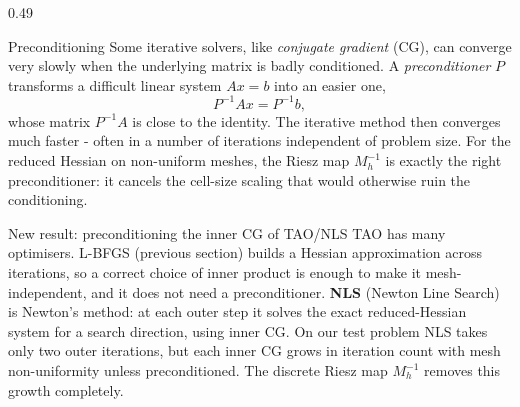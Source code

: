 \documentclass[final]{beamer}
\begin{document}
\begin{frame}[t]
\begin{columns}[t,totalwidth=\dimexpr\paperwidth-3cm\relax]
\begin{column}{0.49\dimexpr\paperwidth-3cm\relax}
\begin{block}{Preconditioning}
Some iterative solvers, like \emph{conjugate gradient} (CG), can converge very slowly when the underlying matrix is badly conditioned. A \emph{preconditioner} $P$ transforms a difficult linear system $Ax = b$ into an easier one,
\[
P^{-1}Ax = P^{-1}b,
\]
whose matrix $P^{-1}A$ is close to the identity. The iterative method then converges much faster - often in a number of iterations independent of problem size. For the reduced Hessian on non-uniform meshes, the Riesz map $M_h^{-1}$ is exactly the right preconditioner: it cancels the cell-size scaling that would otherwise ruin the conditioning.
\end{block}

\begin{alertblock}{New result: preconditioning the inner CG of TAO/NLS}
TAO has many optimisers. L-BFGS (previous section) builds a Hessian approximation across iterations, so a correct choice of inner product is enough to make it mesh-independent, and it does not need a preconditioner. \textbf{NLS} (Newton Line Search) is Newton's method: at each outer step it solves the exact reduced-Hessian system for a search direction, using inner CG. On our test problem NLS takes only two outer iterations, but each inner CG grows in iteration count with mesh non-uniformity unless preconditioned. The discrete Riesz map $M_h^{-1}$ removes this growth completely.

\vspace{0.3em}
\centering
{}


\end{alertblock}
\end{column}
\end{columns}
\end{frame}
\end{document}
